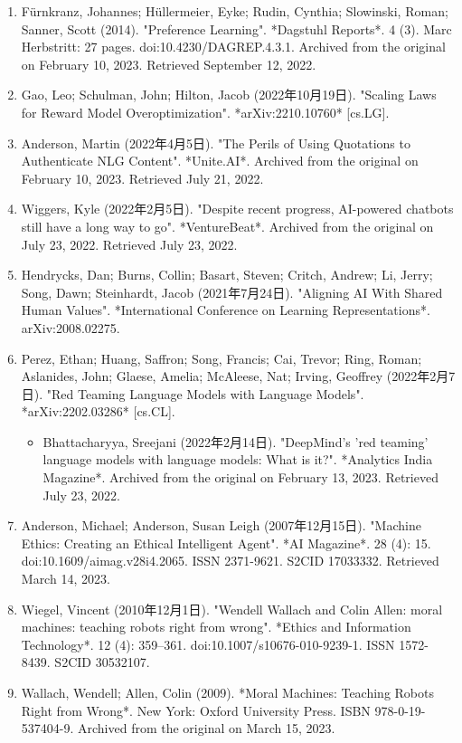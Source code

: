 \begin{enumerate}
\item Fürnkranz, Johannes; Hüllermeier, Eyke; Rudin, Cynthia; Slowinski, Roman; Sanner, Scott (2014). "Preference Learning". *Dagstuhl Reports*. 4 (3). Marc Herbstritt: 27 pages. doi:10.4230/DAGREP.4.3.1. Archived from the original on February 10, 2023. Retrieved September 12, 2022.
\item Gao, Leo; Schulman, John; Hilton, Jacob (2022年10月19日). "Scaling Laws for Reward Model Overoptimization". *arXiv:2210.10760* [cs.LG].
\item Anderson, Martin (2022年4月5日). "The Perils of Using Quotations to Authenticate NLG Content". *Unite.AI*. Archived from the original on February 10, 2023. Retrieved July 21, 2022.
\item Wiggers, Kyle (2022年2月5日). "Despite recent progress, AI-powered chatbots still have a long way to go". *VentureBeat*. Archived from the original on July 23, 2022. Retrieved July 23, 2022.
\item Hendrycks, Dan; Burns, Collin; Basart, Steven; Critch, Andrew; Li, Jerry; Song, Dawn; Steinhardt, Jacob (2021年7月24日). "Aligning AI With Shared Human Values". *International Conference on Learning Representations*. arXiv:2008.02275.
\item Perez, Ethan; Huang, Saffron; Song, Francis; Cai, Trevor; Ring, Roman; Aslanides, John; Glaese, Amelia; McAleese, Nat; Irving, Geoffrey (2022年2月7日). "Red Teaming Language Models with Language Models". *arXiv:2202.03286* [cs.CL].
\begin{itemize}
\item Bhattacharyya, Sreejani (2022年2月14日). "DeepMind's 'red teaming' language models with language models: What is it?". *Analytics India Magazine*. Archived from the original on February 13, 2023. Retrieved July 23, 2022.
\end{itemize}
\item Anderson, Michael; Anderson, Susan Leigh (2007年12月15日). "Machine Ethics: Creating an Ethical Intelligent Agent". *AI Magazine*. 28 (4): 15. doi:10.1609/aimag.v28i4.2065. ISSN 2371-9621. S2CID 17033332. Retrieved March 14, 2023.
\item Wiegel, Vincent (2010年12月1日). "Wendell Wallach and Colin Allen: moral machines: teaching robots right from wrong". *Ethics and Information Technology*. 12 (4): 359–361. doi:10.1007/s10676-010-9239-1. ISSN 1572-8439. S2CID 30532107.
\item Wallach, Wendell; Allen, Colin (2009). *Moral Machines: Teaching Robots Right from Wrong*. New York: Oxford University Press. ISBN 978-0-19-537404-9. Archived from the original on March 15, 2023.

\end{enumerate}
